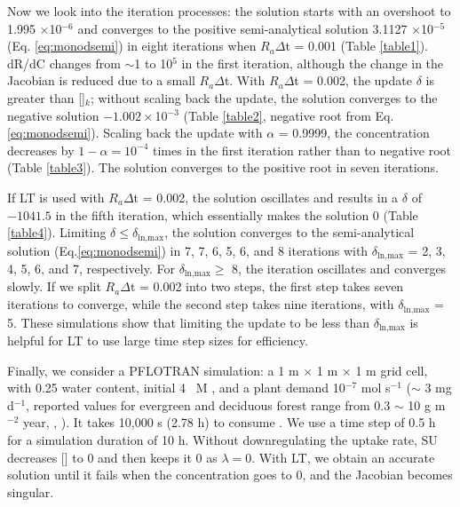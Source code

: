 \documentclass[gmd, manuscript]{copernicus}
\begin{document}
Now we look into the iteration processes: the solution starts with an overshoot
to 1.995 $\times$10$^{-6}$ and converges to the positive semi-analytical solution
3.1127 $\times$10$^{-5}$ (Eq. \ref{eq:monodsemi}) in eight iterations when
$R_a\Delta$t = 0.001 (Table \ref{table1}). dR/dC changes from $\sim$1 to 10$^5$
in the first iteration, although the change in the Jacobian is reduced due to a
small $R_a\Delta$t. With $R_a\Delta$t = 0.002, the update $\delta$ is greater
than []$_k$; without scaling back the update, the solution
converges to the negative solution $-1.002\times$10$^{-3}$ (Table \ref{table2},
negative root from Eq. \ref{eq:monodsemi}). Scaling back the update with
$\alpha$ = 0.9999, the concentration decreases by $1 - \alpha = 10^{-4}$ times in
the first iteration rather than to negative root (Table \ref{table3}). The
solution converges to the positive root in seven iterations. 

If LT is used with $R_a\Delta$t = 0.002, the solution oscillates and results in
a $\delta$ of $-1041.5$ in the fifth iteration, which essentially makes the solution
0 (Table \ref{table4}).   Limiting $\delta \leq \delta_\text{ln,max}$, the
solution converges to the semi-analytical solution (Eq.\ref{eq:monodsemi}) in
7, 7, 6, 5, 6, and 8 iterations with $\delta_\text{ln,max}$ = 2, 3, 4, 5, 6, and
7, respectively.  For $\delta_\text{ln,max}\geq$ 8, the iteration oscillates and
converges slowly.  If we split $R_a\Delta$t = 0.002 into two steps, the first
step takes seven iterations to converge, while the second step takes nine iterations,
with $\delta_\text{ln,max}$ = 5. These simulations show that limiting the update
to be less than $\delta_\text{ln,max}$ is helpful for LT to use large time step
sizes for efficiency.

Finally, we consider a PFLOTRAN simulation: a 1 m $\times$ 1 m $\times$ 1 m
grid cell, with 0.25 water content, initial 4 \unit{\mu M} , and a
plant  demand 10$^{-7}$ mol s$^{-1}$ ($\sim$ 3 mg d$^{-1}$,
reported values for evergreen and deciduous forest range from 0.3 $\sim$ 10 g
m$^{-2}$ year, \citeauthor{Chapin2011}, \citeyear{Chapin2011}). It takes 10,000
\unit{s} (2.78 \unit{h}) to
consume . We use a time step of 0.5 \unit{h} for a simulation
duration of 10 \unit{h}. Without downregulating the uptake rate, SU decreases
[] to 0 and then keeps it 0 as $\lambda=0$. With LT, we obtain an
accurate solution until it fails when the concentration goes to 0, and the
Jacobian becomes singular. 
\end{document}
